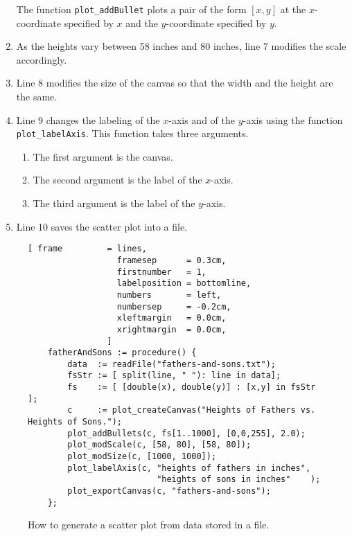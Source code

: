 \begin{enumerate}
      The function \texttt{plot\_addBullet} plots a pair of the form $[x,y]$ at the $x$-coordinate
      specified by $x$ and the $y$-coordinate specified by $y$.
\item As the heights vary between 58 inches and 80 inches, line 7 modifies the scale accordingly.
\item Line 8 modifies the size of the canvas so that the width and the height are the same.
\item Line 9 changes the labeling of the $x$-axis and of the $y$-axis using the function
      \texttt{plot\_labelAxis}.  This function takes three arguments.
      \begin{enumerate}
      \item The first  argument is the canvas.
      \item The second argument is the label of the $x$-axis.
      \item The third  argument is the label of the $y$-axis.
      \end{enumerate}
\item Line 10 saves the scatter plot into a file.
\end{enumerate}



\begin{figure}[!ht]
\centering
\begin{Verbatim}[ frame         = lines, 
                  framesep      = 0.3cm, 
                  firstnumber   = 1,
                  labelposition = bottomline,
                  numbers       = left,
                  numbersep     = -0.2cm,
                  xleftmargin   = 0.0cm,
                  xrightmargin  = 0.0cm,
                ]
    fatherAndSons := procedure() {
        data  := readFile("fathers-and-sons.txt");
        fsStr := [ split(line, " "): line in data];
        fs    := [ [double(x), double(y)] : [x,y] in fsStr ];
        c     := plot_createCanvas("Heights of Fathers vs. Heights of Sons.");
        plot_addBullets(c, fs[1..1000], [0,0,255], 2.0);
        plot_modScale(c, [58, 80], [58, 80]);
        plot_modSize(c, [1000, 1000]);
        plot_labelAxis(c, "heights of fathers in inches", 
                          "heights of sons in inches"    );
        plot_exportCanvas(c, "fathers-and-sons");
    };
\end{Verbatim}
\vspace*{-0.3cm}
\caption{How to generate a scatter plot from data stored in a file.}
\label{fig:fathers-and-sons.stlx}
\end{figure}

